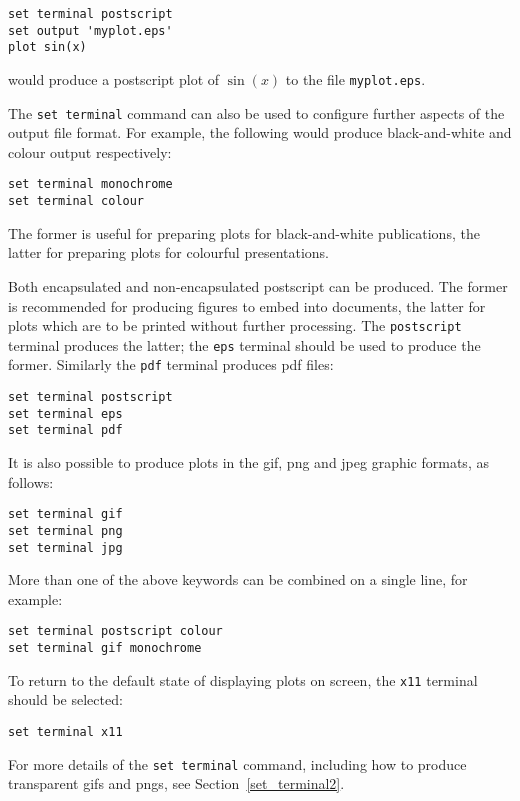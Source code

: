 \begin{verbatim}
set terminal postscript
set output 'myplot.eps'
plot sin(x)
\end{verbatim}

\noindent would produce a postscript plot of $\sin(x)$ to the file
\texttt{myplot.eps}.

The \texttt{set terminal} command can also be used to configure further aspects
of the output file format. For example, the following would produce
black-and-white and colour output respectively:

\begin{verbatim}
set terminal monochrome
set terminal colour
\end{verbatim}

\noindent The former is useful for preparing plots for black-and-white
publications, the latter for preparing plots for colourful presentations.

Both encapsulated and non-encapsulated postscript can be produced. The former
is recommended for producing figures to embed into documents, the latter for
plots which are to be printed without further processing. The
\texttt{postscript} terminal produces the latter; the \texttt{eps} terminal
should be used to produce the former.  Similarly the \texttt{pdf} terminal
produces pdf files:

\begin{verbatim}
set terminal postscript
set terminal eps
set terminal pdf
\end{verbatim}

It is also possible to produce plots in the gif, png and jpeg graphic formats,
as follows:

\begin{verbatim}
set terminal gif
set terminal png
set terminal jpg
\end{verbatim}

More than one of the above keywords can be combined on a single line, for
example:

\begin{verbatim}
set terminal postscript colour
set terminal gif monochrome
\end{verbatim}

To return to the default state of displaying plots on screen, the \texttt{x11}
terminal should be selected:

\begin{verbatim}
set terminal x11
\end{verbatim}

For more details of the \texttt{set terminal} command, including how to produce
transparent gifs and pngs, see Section~\ref{set_terminal2}.

